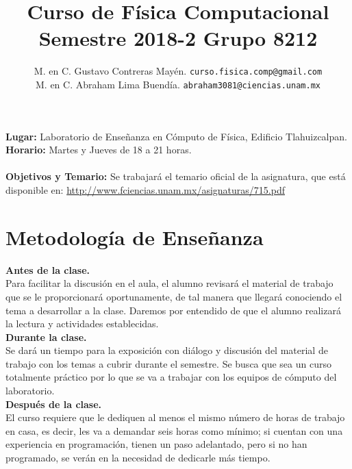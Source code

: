 \documentclass[12pt]{article}
\author{M. en C. Gustavo Contreras Mayén. \texttt{curso.fisica.comp@gmail.com}\\
M. en C. Abraham Lima Buendía. \texttt{abraham3081@ciencias.unam.mx}}
\title{Curso de Física Computacional\\{\large Semestre 2018-2 Grupo 8212}}
\date{ }
\begin{document}
\renewcommand\labelenumii{\theenumi.{\arabic{enumii}}}
\maketitle
\fontsize{12}{12}\selectfont
\textbf{Lugar: }Laboratorio de Enseñanza en Cómputo de Física, Edificio Tlahuizcalpan.
\\
\textbf{Horario: } Martes y Jueves de 18 a 21 horas.
\\
\\
\textbf{Objetivos y Temario:} Se trabajará el temario oficial de la asignatura, que está disponible en: \href{http://www.fciencias.unam.mx/asignaturas/715.pdf}{http://www.fciencias.unam.mx/asignaturas/715.pdf}
\section{Metodología de Enseñanza}
\textbf{Antes de la clase.}
\\
Para facilitar la discusión en el aula, el alumno revisará el material de trabajo que se le proporcionará oportunamente, de tal manera que llegará conociendo el tema a desarrollar a la clase. Daremos por entendido de que el alumno realizará la lectura y actividades establecidas.
\\
\textbf{Durante la clase.}
\\
Se dará un tiempo para la exposición con diálogo y discusión del material de trabajo con los temas a cubrir durante el semestre. Se busca que sea un curso totalmente práctico por lo que se va a trabajar con los equipos de cómputo del laboratorio.
\\
\textbf{Después de la clase.}
\\
El curso requiere que le dediquen al menos el mismo número de horas de trabajo en casa, es decir, les va a demandar seis horas como mínimo; si cuentan con una experiencia en programación, tienen un paso adelantado, pero si no han programado, se verán en la necesidad de dedicarle más tiempo.
\end{document}
